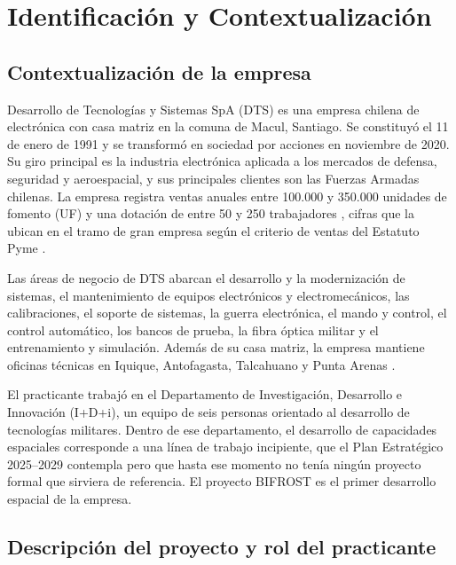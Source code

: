 \section{Identificación y Contextualización}

\subsection{Contextualización de la empresa}

Desarrollo de Tecnologías y Sistemas SpA (DTS) es una empresa chilena de electrónica con casa matriz en la comuna de Macul, Santiago. Se constituyó el 11 de enero de 1991 y se transformó en sociedad por acciones en noviembre de 2020. Su giro principal es la industria electrónica aplicada a los mercados de defensa, seguridad y aeroespacial, y sus principales clientes son las Fuerzas Armadas chilenas. La empresa registra ventas anuales entre 100.000 y 350.000 unidades de fomento (UF) y una dotación de entre 50 y 250 trabajadores \parencite{redconecta}, cifras que la ubican en el tramo de gran empresa según el criterio de ventas del Estatuto Pyme \parencite{minecon}.

Las áreas de negocio de DTS abarcan el desarrollo y la modernización de sistemas, el mantenimiento de equipos electrónicos y electromecánicos, las calibraciones, el soporte de sistemas, la guerra electrónica, el mando y control, el control automático, los bancos de prueba, la fibra óptica militar y el entrenamiento y simulación. Además de su casa matriz, la empresa mantiene oficinas técnicas en Iquique, Antofagasta, Talcahuano y Punta Arenas \parencite{dts}.

El practicante trabajó en el Departamento de Investigación, Desarrollo e Innovación (I+D+i), un equipo de seis personas orientado al desarrollo de tecnologías militares. Dentro de ese departamento, el desarrollo de capacidades espaciales corresponde a una línea de trabajo incipiente, que el Plan Estratégico 2025--2029 contempla pero que hasta ese momento no tenía ningún proyecto formal que sirviera de referencia. El proyecto BIFROST es el primer desarrollo espacial de la empresa.


\subsection{Descripción del proyecto y rol del practicante}

